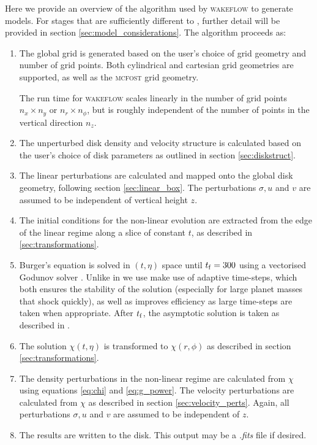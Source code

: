 Here we provide an overview of the algorithm used by \textsc{wakeflow} to generate models.
For stages that are sufficiently different to \citet{bollati2021}, further detail will be provided in section \ref{sec:model_considerations}.
The algorithm proceeds as:
\begin{enumerate}
    \item The global grid is generated based on the user's choice of grid geometry and number of grid points. Both cylindrical and cartesian grid geometries are supported, as well as the \textsc{mcfost} grid geometry.
    
    The run time for \textsc{wakeflow} scales linearly in the number of grid points $n_x \times n_y$ or $n_r \times n_\phi$, but is roughly independent of the number of points in the vertical direction $n_z$.
    
    \item The unperturbed disk density and velocity structure is calculated based on the user's choice of disk parameters as outlined in section \ref{sec:diskstruct}.
    
    \item The linear perturbations are calculated and mapped onto the global disk geometry, following section \ref{sec:linear_box}. The perturbations $\sigma, u$ and $v$ are assumed to be independent of vertical height $z$.
    
    \item The initial conditions for the non-linear evolution are extracted from the edge of the linear regime along a slice of constant $t$, as described in \ref{sec:transformations}.
    
    \item Burger's equation is solved in $(t,\eta)$ space until $t_{\rm f}=300$ using a vectorised Godunov solver \citep{astrofluids}. Unlike in \citet{bollati2021} we use make use of adaptive time-steps, which both ensures the stability of the solution (especially for large planet masses that shock quickly), as well as improves efficiency as large time-steps are taken when appropriate. After $t_{\rm f}$, the asymptotic solution is taken as described in \citet{bollati2021}.
    
    \item The solution $\chi(t,\eta)$ is transformed to $\chi(r,\phi)$ as described in section \ref{sec:transformations}.
    
    \item The density perturbations in the non-linear regime are calculated from $\chi$ using equations \ref{eq:chi} and \ref{eq:g_power}. The velocity perturbations are calculated from $\chi$ as described in section \ref{sec:velocity_perts}. Again, all perturbations $\sigma, u$ and $v$ are assumed to be independent of $z$.
    
    \item The results are written to the disk. This output may be a \textit{.fits} file if desired.
\end{enumerate}

